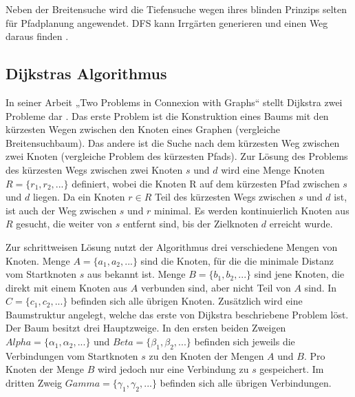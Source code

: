 Neben der Breitensuche wird die Tiefensuche wegen ihres blinden Prinzips selten für Pfadplanung angewendet. DFS kann Irrgärten generieren und einen Weg daraus finden \cite{KB15}. 


\subsection{Dijkstras Algorithmus}
In seiner Arbeit „Two Problems in Connexion with Graphs“ stellt Dijkstra zwei Probleme dar \cite{Dijkstra.1959}. Das erste Problem ist die Konstruktion eines Baums mit den kürzesten Wegen zwischen den Knoten eines Graphen (vergleiche Breitensuchbaum). Das andere ist die Suche nach dem kürzesten Weg zwischen zwei Knoten (vergleiche Problem des kürzesten Pfads).
Zur Lösung des Problems des kürzesten Wegs zwischen zwei Knoten $s$ und $d$ wird eine Menge Knoten $R = \{r_1, r_2, ...\}$ definiert, wobei die Knoten R auf dem kürzesten Pfad zwischen $s$ und $d$ liegen. %
Da ein Knoten $r \in R$ Teil des kürzesten Wegs zwischen $s$ und $d$ ist, ist auch der Weg zwischen $s$ und $r$ minimal. Es werden kontinuierlich Knoten aus $R$ gesucht, die weiter von $s$ entfernt sind, bis der Zielknoten $d$ erreicht wurde.

Zur schrittweisen Lösung nutzt der Algorithmus drei verschiedene Mengen von Knoten. Menge $A = \{a_1, a_2, ...\}$ sind die Knoten, für die die minimale Distanz vom Startknoten $s$ aus bekannt ist. Menge $B = \{b_1, b_2, ...\}$ sind jene Knoten, die direkt mit einem Knoten aus $A$ verbunden sind, aber nicht Teil von $A$ sind. In $C = \{c_1, c_2, ...\}$ befinden sich alle übrigen Knoten.
Zusätzlich wird eine Baumstruktur angelegt, welche das erste von Dijkstra beschriebene Problem löst. Der Baum besitzt drei Hauptzweige. In den ersten beiden Zweigen $Alpha = \{\alpha_1, \alpha_2, ...\}$ und $Beta = \{\beta_1, \beta_2, ...\}$ befinden sich jeweils die Verbindungen vom Startknoten $s$ zu den Knoten der Mengen $A$ und $B$. Pro Knoten der Menge $B$ wird jedoch nur eine Verbindung zu $s$ gespeichert. Im dritten Zweig $Gamma = \{\gamma_1, \gamma_2, ...\}$ befinden sich alle übrigen Verbindungen.

